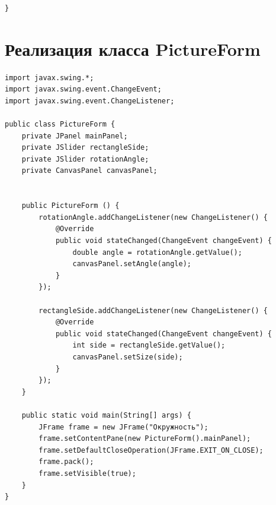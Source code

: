 \documentclass[a4paper, 14pt]{extarticle}
\begin{document}
{\begin{verbatim}
}
\end{verbatim}
}

\section{Реализация класса PictureForm}
{\scriptsize
\begin{verbatim}
import javax.swing.*;
import javax.swing.event.ChangeEvent;
import javax.swing.event.ChangeListener;

public class PictureForm {
    private JPanel mainPanel;
    private JSlider rectangleSide;
    private JSlider rotationAngle;
    private CanvasPanel canvasPanel;


    public PictureForm () {
        rotationAngle.addChangeListener(new ChangeListener() {
            @Override
            public void stateChanged(ChangeEvent changeEvent) {
                double angle = rotationAngle.getValue();
                canvasPanel.setAngle(angle);
            }
        });

        rectangleSide.addChangeListener(new ChangeListener() {
            @Override
            public void stateChanged(ChangeEvent changeEvent) {
                int side = rectangleSide.getValue();
                canvasPanel.setSize(side);
            }
        });
    }

    public static void main(String[] args) {
        JFrame frame = new JFrame("Окружность");
        frame.setContentPane(new PictureForm().mainPanel);
        frame.setDefaultCloseOperation(JFrame.EXIT_ON_CLOSE);
        frame.pack();
        frame.setVisible(true);
    }
}
\end{verbatim}
}
\end{document}
